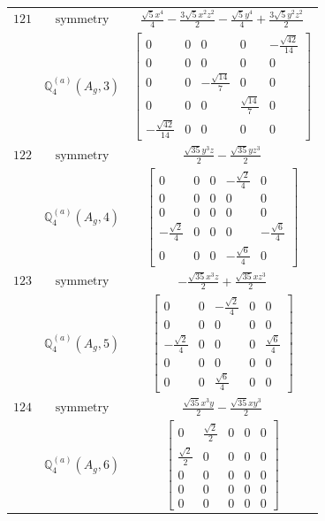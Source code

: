 \documentclass[fleqn,8pt,landscape]{jsarticle}
\begin{document}
\begin{longtable}{ccc}
$ 121 $ & $ \text{symmetry} $ & $ \frac{\sqrt{5} x^{4}}{4} - \frac{3 \sqrt{5} x^{2} z^{2}}{2} - \frac{\sqrt{5} y^{4}}{4} + \frac{3 \sqrt{5} y^{2} z^{2}}{2} $ \\
$  $ & $ \mathbb{Q}_{4}^{(a)}(A_{g},3) $ & $ \begin{bmatrix} 0 & 0 & 0 & 0 & - \frac{\sqrt{42}}{14} \\ 0 & 0 & 0 & 0 & 0 \\ 0 & 0 & - \frac{\sqrt{14}}{7} & 0 & 0 \\ 0 & 0 & 0 & \frac{\sqrt{14}}{7} & 0 \\ - \frac{\sqrt{42}}{14} & 0 & 0 & 0 & 0 \end{bmatrix} $ \\ \hline
$ 122 $ & $ \text{symmetry} $ & $ \frac{\sqrt{35} y^{3} z}{2} - \frac{\sqrt{35} y z^{3}}{2} $ \\
$  $ & $ \mathbb{Q}_{4}^{(a)}(A_{g},4) $ & $ \begin{bmatrix} 0 & 0 & 0 & - \frac{\sqrt{2}}{4} & 0 \\ 0 & 0 & 0 & 0 & 0 \\ 0 & 0 & 0 & 0 & 0 \\ - \frac{\sqrt{2}}{4} & 0 & 0 & 0 & - \frac{\sqrt{6}}{4} \\ 0 & 0 & 0 & - \frac{\sqrt{6}}{4} & 0 \end{bmatrix} $ \\ \hline
$ 123 $ & $ \text{symmetry} $ & $ - \frac{\sqrt{35} x^{3} z}{2} + \frac{\sqrt{35} x z^{3}}{2} $ \\
$  $ & $ \mathbb{Q}_{4}^{(a)}(A_{g},5) $ & $ \begin{bmatrix} 0 & 0 & - \frac{\sqrt{2}}{4} & 0 & 0 \\ 0 & 0 & 0 & 0 & 0 \\ - \frac{\sqrt{2}}{4} & 0 & 0 & 0 & \frac{\sqrt{6}}{4} \\ 0 & 0 & 0 & 0 & 0 \\ 0 & 0 & \frac{\sqrt{6}}{4} & 0 & 0 \end{bmatrix} $ \\ \hline
$ 124 $ & $ \text{symmetry} $ & $ \frac{\sqrt{35} x^{3} y}{2} - \frac{\sqrt{35} x y^{3}}{2} $ \\
$  $ & $ \mathbb{Q}_{4}^{(a)}(A_{g},6) $ & $ \begin{bmatrix} 0 & \frac{\sqrt{2}}{2} & 0 & 0 & 0 \\ \frac{\sqrt{2}}{2} & 0 & 0 & 0 & 0 \\ 0 & 0 & 0 & 0 & 0 \\ 0 & 0 & 0 & 0 & 0 \\ 0 & 0 & 0 & 0 & 0 \end{bmatrix} $ \\ \hline

\end{longtable}
\end{document}
